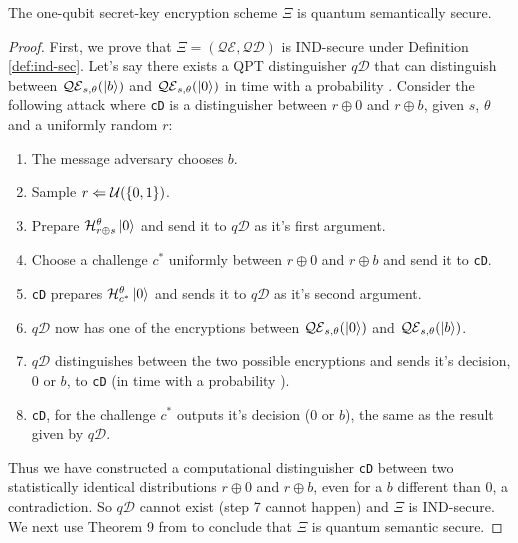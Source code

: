 \begin{theorem}
\label{thm:xi-semsecure}
The one-qubit secret-key encryption scheme $\Xi$ is quantum semantically secure.
\end{theorem}
\begin{proof}
First, we prove that $\Xi = (\mathcal{QE},\mathcal{QD})$ is IND-secure under Definition \ref{def:ind-sec}. Let's say there exists a QPT distinguisher $q\mathcal{D}$ that can distinguish between $\mathcal{QE}_{s,\theta}(\ket{b})$ and $\mathcal{QE}_{s,\theta}(\ket{0})$ in time \poly \text{ } with a probability \nonegl. Consider the following attack where \texttt{cD} is a distinguisher between $r \oplus 0$ and $r \oplus b$, given $s$, $\theta$ and a uniformly random $r$:
\begin{enumerate}
\item The message adversary chooses $b$.
\item Sample $r \Leftarrow \mathcal{U}(\{0,1\})$.
\item Prepare $\mathcal{H}^\theta_{r \oplus s}\ket{0}$ and send it to $q\mathcal{D}$ as it's first argument.
\item Choose a challenge $c^*$ uniformly between $r \oplus 0$ and $r \oplus b$ and send it to \texttt{cD}.
\item \texttt{cD} prepares $\mathcal{H}^\theta_{c^*}\ket{0}$ and sends it to $q\mathcal{D}$ as it's second argument.
\item $q\mathcal{D}$ now has one of the encryptions between $\mathcal{QE}_{s,\theta}(\ket{0})$ and $\mathcal{QE}_{s,\theta}(\ket{b})$.
\item $q\mathcal{D}$ distinguishes between the two possible encryptions and sends it's decision, $0$ or $b$, to \texttt{cD} (in time \poly \text{ } with a probability \nonegl).
\item \texttt{cD}, for the challenge $c^*$ outputs it's decision ($0$ or $b$), the same as the result given by $q\mathcal{D}$.
\end{enumerate}
Thus we have constructed a computational distinguisher \texttt{cD} between two statistically identical distributions $r \oplus 0$ and $r \oplus b$, even for a $b$ different than $0$, a contradiction. So $q\mathcal{D}$ cannot exist (step 7 cannot happen) and $\Xi$ is IND-secure. \\
We next use Theorem 9 from \cite{compsec} to conclude that $\Xi$ is quantum semantic secure. 
\end{proof}


